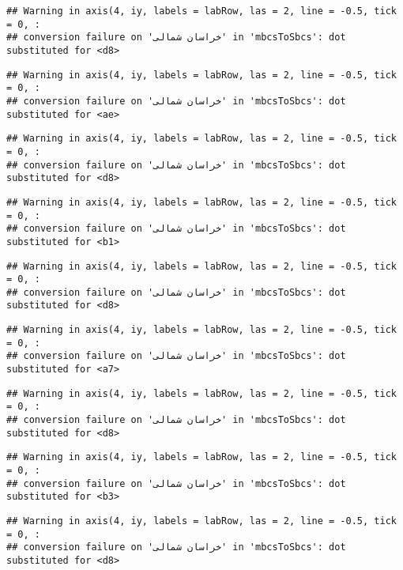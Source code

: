 \documentclass[
]{article}
\begin{document}
\begin{verbatim}
## Warning in axis(4, iy, labels = labRow, las = 2, line = -0.5, tick = 0, :
## conversion failure on 'خراسان شمالی' in 'mbcsToSbcs': dot substituted for <d8>
\end{verbatim}

\begin{verbatim}
## Warning in axis(4, iy, labels = labRow, las = 2, line = -0.5, tick = 0, :
## conversion failure on 'خراسان شمالی' in 'mbcsToSbcs': dot substituted for <ae>
\end{verbatim}

\begin{verbatim}
## Warning in axis(4, iy, labels = labRow, las = 2, line = -0.5, tick = 0, :
## conversion failure on 'خراسان شمالی' in 'mbcsToSbcs': dot substituted for <d8>
\end{verbatim}

\begin{verbatim}
## Warning in axis(4, iy, labels = labRow, las = 2, line = -0.5, tick = 0, :
## conversion failure on 'خراسان شمالی' in 'mbcsToSbcs': dot substituted for <b1>
\end{verbatim}

\begin{verbatim}
## Warning in axis(4, iy, labels = labRow, las = 2, line = -0.5, tick = 0, :
## conversion failure on 'خراسان شمالی' in 'mbcsToSbcs': dot substituted for <d8>
\end{verbatim}

\begin{verbatim}
## Warning in axis(4, iy, labels = labRow, las = 2, line = -0.5, tick = 0, :
## conversion failure on 'خراسان شمالی' in 'mbcsToSbcs': dot substituted for <a7>
\end{verbatim}

\begin{verbatim}
## Warning in axis(4, iy, labels = labRow, las = 2, line = -0.5, tick = 0, :
## conversion failure on 'خراسان شمالی' in 'mbcsToSbcs': dot substituted for <d8>
\end{verbatim}

\begin{verbatim}
## Warning in axis(4, iy, labels = labRow, las = 2, line = -0.5, tick = 0, :
## conversion failure on 'خراسان شمالی' in 'mbcsToSbcs': dot substituted for <b3>
\end{verbatim}

\begin{verbatim}
## Warning in axis(4, iy, labels = labRow, las = 2, line = -0.5, tick = 0, :
## conversion failure on 'خراسان شمالی' in 'mbcsToSbcs': dot substituted for <d8>
\end{verbatim}
\end{document}
